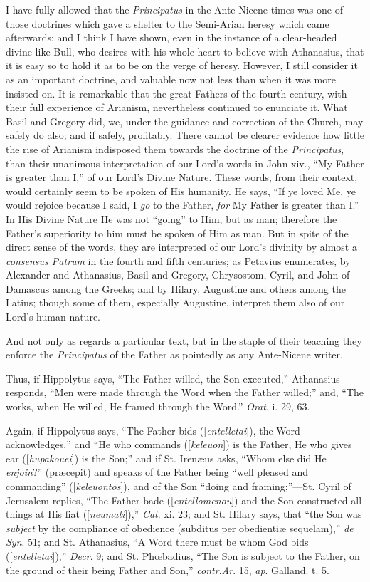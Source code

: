 I have fully allowed that the \emph{Principatus} in the Ante-Nicene
times was one of those doctrines which gave a shelter to the
Semi-Arian heresy which came afterwards; and I think I have shown,
even in the instance of a clear-headed divine like Bull, who desires
with his whole heart to believe with Athanasius, that it is easy so to
hold it as to be on the verge of heresy. However, I still consider it
as an important doctrine, and valuable now not less than when it was
more insisted on. It is remarkable that the great Fathers of the
fourth century, with their full experience of Arianism, nevertheless
continued to enunciate it. What Basil and Gregory did, we, under the
guidance and correction of the Church, may safely do also; and if
safely, profitably. There cannot be clearer evidence how little the
rise of Arianism indisposed them towards the doctrine of the \emph{Principatus},
than their unanimous interpretation of our Lord's words in John xiv.,
``My Father is greater than I,'' of our Lord's Divine Nature.
These words, from their context, would certainly seem to be spoken of
His humanity. He says, ``If ye loved Me, ye would rejoice because
I said, I \emph{go} to the Father, \emph{for} My Father is greater
than I.'' In His Divine Nature He was not ``going'' to
Him, but as man; therefore the Father's superiority to him must be
spoken of Him as man. But in spite of the direct sense of the words,
they are interpreted of our Lord's divinity by almost a \emph{consensus
Patrum} in the fourth and fifth centuries; as Petavius enumerates,
by Alexander and Athanasius, Basil and Gregory, Chrysostom, Cyril, and
John of Damascus among the Greeks; and by Hilary, Augustine and others
among the Latins; though some of them, especially Augustine,
interpret them also of our Lord's human nature.

And not only as regards a particular text, but in the staple of
their teaching they enforce the \emph{Principatus} of the Father as
pointedly as any Ante-Nicene writer.

Thus, if Hippolytus says, ``The Father willed, the Son
executed,'' Athanasius responds, ``Men were made through the
Word when the Father willed;'' and, ``The works, when He
willed, He framed through the Word.'' \emph{Orat}. i. 29, 63.

Again, if Hippolytus says, ``The Father bids ([\emph{entelletai}]),
the Word acknowledges,'' and ``He who commands ([\emph{keleu\={o}n}])
is the Father, He who gives ear ([\emph{hupakouei}]) is the Son;''
and if St. Irenæus asks, ``Whom else did He \emph{enjoin}?''
(præcepit) and speaks of the Father being ``well pleased and
commanding'' ([\emph{keleuontos}]), and of the Son ``doing and
framing;''—St. Cyril of Jerusalem replies, ``The Father bade
([\emph{entellomenou}]) and the Son constructed all things at His fiat
([\emph{neumati}]),'' \emph{Cat}. xi. 23; and St. Hilary says, that
``the Son was \emph{subject} by the compliance of obedience (subditus
per obedientiæ sequelam),'' \emph{de Syn}. 51; and St. Athanasius,
``A Word there must be whom God bids ([\emph{entelletai}]),'' \emph{Decr}.
9; and St. Phœbadius, ``The Son is subject to the Father, on the
ground of their being Father and Son,'' \emph{contr}.\emph{Ar}.
15, \emph{ap}. Galland. t. 5.

